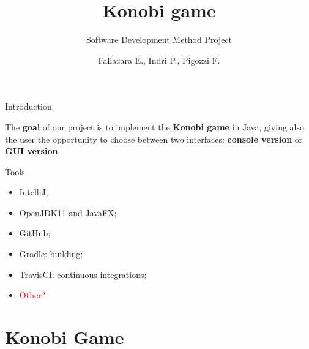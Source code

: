 \documentclass{beamer}
\title{Konobi game}
\subtitle{Software Development Method Project}
\author{Fallacara E., Indri P., Pigozzi F.}
\date{}
\begin{document}
	\setcounter{showSlideNumbers}{0}

	\frame{\titlepage}

	\setcounter{framenumber}{0}
	\setcounter{showSlideNumbers}{1}

  

  \begin{frame}{Introduction}

    \begin{tcolorbox}[colback=red!90!black!10]
      The \textbf{goal} of our project is to implement the \textbf{Konobi game} in Java, giving also the user the opportunity to choose between two interfaces: \textbf{console version} or \textbf{GUI version}
    \end{tcolorbox}

    \vspace{1em}

    \begin{block}{Tools}
      \begin{itemize}
      \item IntelliJ;
        \item OpenJDK11 and JavaFX;
        \item GitHub;
        \item Gradle: building;
        \item TravisCI: continuous integrations;
        \item \textcolor{red}{Other?}
      \end{itemize}
    \end{block}

  \end{frame}


\section{Konobi Game}
\end{document}
